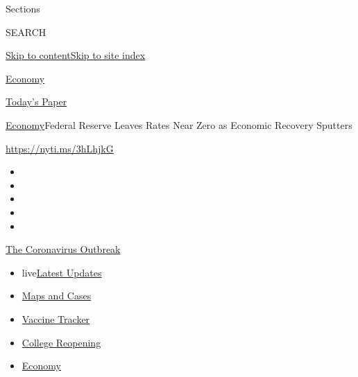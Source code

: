 Sections

SEARCH

\protect\hyperlink{site-content}{Skip to
content}\protect\hyperlink{site-index}{Skip to site index}

\href{https://www.nytimes3xbfgragh.onion/section/business/economy}{Economy}

\href{https://myaccount.nytimes3xbfgragh.onion/auth/login?response_type=cookie\&client_id=vi}{}

\href{https://www.nytimes3xbfgragh.onion/section/todayspaper}{Today's
Paper}

\href{/section/business/economy}{Economy}\textbar{}Federal Reserve
Leaves Rates Near Zero as Economic Recovery Sputters

\url{https://nyti.ms/3hLhjkG}

\begin{itemize}
\item
\item
\item
\item
\item
\end{itemize}

\href{https://www.nytimes3xbfgragh.onion/news-event/coronavirus?action=click\&pgtype=Article\&state=default\&region=TOP_BANNER\&context=storylines_menu}{The
Coronavirus Outbreak}

\begin{itemize}
\tightlist
\item
  live\href{https://www.nytimes3xbfgragh.onion/2020/08/03/world/coronavirus-covid-19.html?action=click\&pgtype=Article\&state=default\&region=TOP_BANNER\&context=storylines_menu}{Latest
  Updates}
\item
  \href{https://www.nytimes3xbfgragh.onion/interactive/2020/us/coronavirus-us-cases.html?action=click\&pgtype=Article\&state=default\&region=TOP_BANNER\&context=storylines_menu}{Maps
  and Cases}
\item
  \href{https://www.nytimes3xbfgragh.onion/interactive/2020/science/coronavirus-vaccine-tracker.html?action=click\&pgtype=Article\&state=default\&region=TOP_BANNER\&context=storylines_menu}{Vaccine
  Tracker}
\item
  \href{https://www.nytimes3xbfgragh.onion/2020/08/02/us/covid-college-reopening.html?action=click\&pgtype=Article\&state=default\&region=TOP_BANNER\&context=storylines_menu}{College
  Reopening}
\item
  \href{https://www.nytimes3xbfgragh.onion/live/2020/08/03/business/stock-market-today-coronavirus?action=click\&pgtype=Article\&state=default\&region=TOP_BANNER\&context=storylines_menu}{Economy}
\end{itemize}

